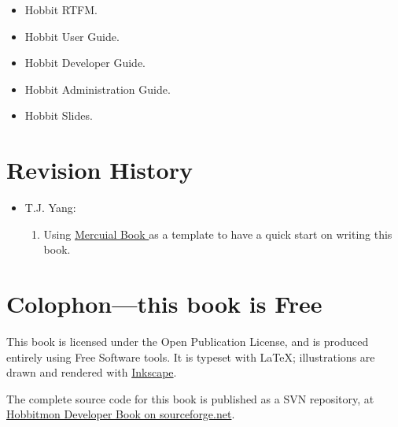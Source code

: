 \begin{itemize}
\item Hobbit RTFM.
\item Hobbit User Guide.
\item Hobbit Developer Guide.
\item Hobbit Administration Guide.
\item Hobbit Slides.

\end{itemize}

\section{Revision History}

\begin{itemize}
\item T.J. Yang:
 \begin{enumerate}
  \item Using \href{http://hg.serpentine.com/mercurial/book/}{Mercuial Book } as a template to have a quick start on
    writing this book.
 \end{enumerate}

\end{itemize}

\section{Colophon---this book is Free}

This book is licensed under the Open Publication License, and is
produced entirely using Free Software tools.  It is typeset with
\LaTeX{}; illustrations are drawn and rendered with
\href{http://www.inkscape.org/}{Inkscape}.

The complete source code for this book is published as a SVN
repository, at
\href{http://hobbitmon.svn.sourceforge.net/viewvc/hobbitmon/branches/tjyang/src/books/hobbitmon-developer/en/}{Hobbitmon
  Developer Book on sourceforge.net}.


